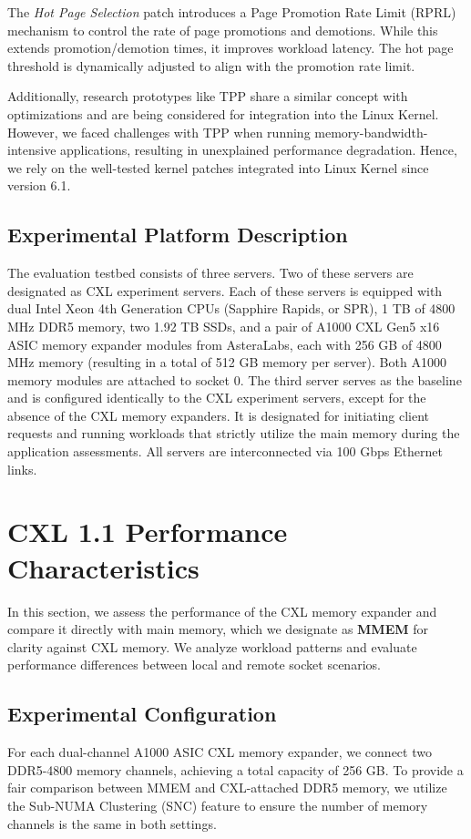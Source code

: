 The \textit{Hot Page Selection} patch introduces a Page Promotion Rate Limit (RPRL) mechanism to control the rate of page promotions and demotions. While this extends promotion/demotion times, it improves workload latency. The hot page threshold is dynamically adjusted to align with the promotion rate limit.

Additionally, research prototypes like TPP share a similar concept with optimizations and are being considered for integration into the Linux Kernel. However, we faced challenges with TPP when running memory-bandwidth-intensive applications, resulting in unexplained performance degradation. Hence, we rely on the well-tested kernel patches integrated into Linux Kernel since version 6.1.

\subsection{Experimental Platform Description}

The evaluation testbed consists of three servers. Two of these servers are designated as CXL experiment servers. Each of these servers is equipped with dual Intel Xeon 4th Generation CPUs (Sapphire Rapids, or SPR), 1 TB of 4800 MHz DDR5 memory, two 1.92 TB SSDs, and a pair of A1000 CXL Gen5 x16 ASIC memory expander modules from AsteraLabs, each with 256 GB of 4800 MHz memory (resulting in a total of 512 GB memory per server). Both A1000 memory modules are attached to socket 0. The third server serves as the baseline and is configured identically to the CXL experiment servers, except for the absence of the CXL memory expanders. It is designated for initiating client requests and running workloads that strictly utilize the main memory during the application assessments. All servers are interconnected via 100 Gbps Ethernet links.


\section{CXL 1.1 Performance Characteristics} \label{sec
}

In this section, we assess the performance of the CXL memory expander and compare it directly with main memory, which we designate as \textbf{MMEM} for clarity against CXL memory. We analyze workload patterns and evaluate performance differences between local and remote socket scenarios.

\subsection{Experimental Configuration} \label{ssec
} For each dual-channel A1000 ASIC CXL memory expander, we connect two DDR5-4800 memory channels, achieving a total capacity of 256 GB. To provide a fair comparison between MMEM and CXL-attached DDR5 memory, we utilize the Sub-NUMA Clustering (SNC) feature to ensure the number of memory channels is the same in both settings.

